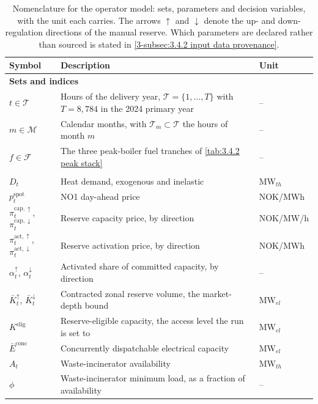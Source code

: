 \begin{table}[!htbp]
\centering
\caption{Nomenclature for the operator model: sets, parameters and decision variables, with the unit each carries. The arrows $\uparrow$ and $\downarrow$ denote the up- and down-regulation directions of the manual reserve. Which parameters are declared rather than sourced is stated in \autoref{3-subsec:3.4.2 input data provenance}.}
\footnotesize
\renewcommand{\arraystretch}{1.18}
\begin{tabular}{p{2.4cm} p{8.9cm} p{2.3cm}}
\toprule
\textbf{Symbol} & \textbf{Description} & \textbf{Unit} \\
\midrule
\multicolumn{3}{l}{\textbf{Sets and indices}} \\
$t \in \mathcal{T}$ & Hours of the delivery year, $\mathcal{T} = \{1, \dots, T\}$ with $T = 8{,}784$ in the 2024 primary year & -- \\
$m \in \mathcal{M}$ & Calendar months, with $\mathcal{T}_m \subset \mathcal{T}$ the hours of month $m$ & -- \\
$f \in \mathcal{F}$ & The three peak-boiler fuel tranches of \autoref{tab:3.4.2 peak stack} & -- \\
\addlinespace
\multicolumn{3}{l}{\textbf{Parameters}} \\
$D_t$ & Heat demand, exogenous and inelastic & MW$_{th}$ \\
$p^{\text{spot}}_t$ & NO1 day-ahead price & NOK/MWh \\
$\pi^{\text{cap},\uparrow}_t$, $\pi^{\text{cap},\downarrow}_t$ & Reserve capacity price, by direction & NOK/MW/h \\
$\pi^{\text{act},\uparrow}_t$, $\pi^{\text{act},\downarrow}_t$ & Reserve activation price, by direction & NOK/MWh \\
$\alpha^{\uparrow}_t$, $\alpha^{\downarrow}_t$ & Activated share of committed capacity, by direction & -- \\
$\bar{K}^{\uparrow}_t$, $\bar{K}^{\downarrow}_t$ & Contracted zonal reserve volume, the market-depth bound & MW$_{el}$ \\
$K^{\text{elig}}$ & Reserve-eligible capacity, the access level the run is set to & MW$_{el}$ \\
$\bar{E}^{\text{conc}}$ & Concurrently dispatchable electrical capacity & MW$_{el}$ \\
$A_t$ & Waste-incinerator availability & MW$_{th}$ \\
$\phi$ & Waste-incinerator minimum load, as a fraction of availability & -- \\

\end{tabular}
\end{table}
